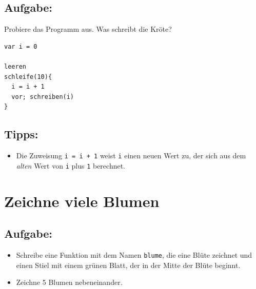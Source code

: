 \section*{\color{BrickRed}Aufgabe:}
Probiere das Programm aus. Was schreibt die Kröte?

\begin{lstlisting}[basicstyle={\ttfamily\fontsize{14}{17}\selectfont},numbers=none]
var i = 0

leeren
schleife(10){
  i = i + 1
  vor; schreiben(i)
}
\end{lstlisting}
        
\section*{\color{OliveGreen}Tipps:}


\begin{itemize}

\item {Die Zuweisung \lstinline{i = i + 1} weist \lstinline{i} einen neuen Wert zu, der sich aus dem {\it alten} Wert von \lstinline{i} plus \lstinline{1} berechnet.}

\end{itemize}


\chapter{Zeichne viele Blumen}\section*{\color{BrickRed}Aufgabe:}


\begin{itemize}

\item {Schreibe eine Funktion mit dem Namen \lstinline{blume}, die eine Blüte zeichnet und einen Stiel mit einem grünen Blatt, der in der Mitte der Blüte beginnt.}
\item {Zeichne 5 Blumen nebeneinander.}

\end{itemize}



  
